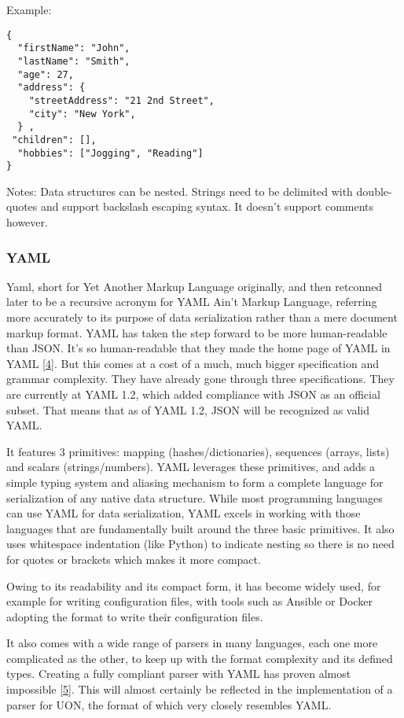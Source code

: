 \documentclass[12pt]{article}
\begin{document}
Example:
\begin{verbatim}
{
  "firstName": "John",
  "lastName": "Smith",
  "age": 27,
  "address": {
    "streetAddress": "21 2nd Street",
    "city": "New York",
  } ,
 "children": [],
  "hobbies": ["Jogging", "Reading"]
}
\end{verbatim}

Notes: Data structures can be nested. Strings need to be delimited with double-quotes and support backslash escaping syntax. It doesn’t support comments however.

\subsubsection{YAML}
Yaml, short for Yet Another Markup Language originally, and then retconned later to be a recursive acronym for YAML Ain't Markup Language,  referring more accurately to its purpose of data serialization rather than a mere document markup format. 
YAML has taken the step forward to be more human-readable than JSON. It’s so human-readable that they made the home page of YAML in YAML \href{https://yaml.org/}{[4]}. But this comes at a cost of a much, much bigger specification and grammar complexity. They have already gone through three specifications. They are currently at YAML 1.2, which added compliance with JSON as an official subset. That means that as of YAML 1.2, JSON will be recognized as valid YAML.

It features 3 primitives: mapping (hashes/dictionaries), sequences (arrays, lists) and scalars (strings/numbers). YAML leverages these primitives, and adds a simple typing system and aliasing mechanism to form a complete language for serialization of any native data structure. While most programming languages can use YAML for data serialization, YAML excels in working with those languages that are fundamentally built around the three basic primitives. It also uses whitespace indentation (like Python) to indicate nesting so there is no need for quotes or brackets which makes it more compact.

Owing to its readability and its compact form, it has become widely used, for example for writing configuration files, with tools such as Ansible or Docker adopting the format to write their configuration files.

It also comes with a wide range of parsers in many languages, each one more complicated as the other, to keep up with the format complexity and its defined types. Creating a fully compliant parser with YAML has proven almost impossible \href{https://github.com/yaml/yaml-grammar}{[5]}. This will almost certainly be reflected in the implementation of a parser for UON, the format of which very closely resembles YAML.
\end{document}

